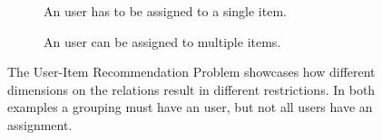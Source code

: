 \begin{figure}[!ht]
    \centering
    \begin{subfigure}[b]{0.45\textwidth}
        \centering
        \caption{An user has to be assigned to a single item.}
        \label{fig:1_!}
    \end{subfigure}
    \hfill
    \begin{subfigure}[b]{0.45\textwidth}
        \centering
        \caption{An user can be assigned to multiple items.}
        \label{fig:1_N}
    \end{subfigure}
    
    \caption[The User-Item Recommendation Problem.]{The User-Item Recommendation Problem showcases how different dimensions on the relations result in different restrictions.
            In both examples a grouping must have an user, but not all users have an assignment.}
    \label{fig:relation_geometry}
\end{figure}